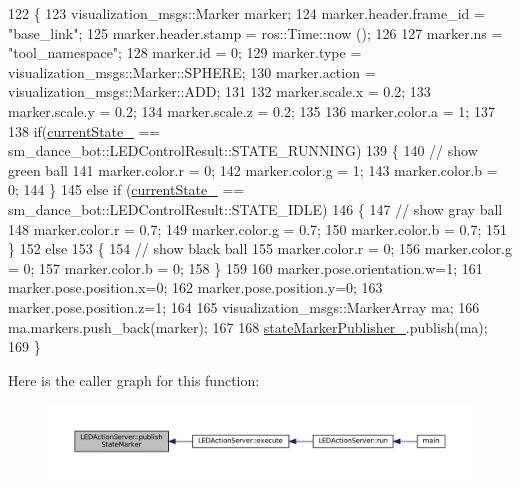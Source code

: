 \begin{DoxyCode}
122 \{
123     visualization\_msgs::Marker marker;
124     marker.header.frame\_id = \textcolor{stringliteral}{"base\_link"};
125     marker.header.stamp = ros::Time::now ();
126 
127     marker.ns = \textcolor{stringliteral}{"tool\_namespace"};
128     marker.id = 0;
129     marker.type = visualization\_msgs::Marker::SPHERE;
130     marker.action = visualization\_msgs::Marker::ADD;
131     
132     marker.scale.x = 0.2;
133     marker.scale.y = 0.2;
134     marker.scale.z = 0.2;
135 
136     marker.color.a = 1;
137 
138     \textcolor{keywordflow}{if}(\hyperlink{classLEDActionServer_a1dc456e987dc331501ad6ff2215661ff}{currentState\_} == sm\_dance\_bot::LEDControlResult::STATE\_RUNNING)
139     \{
140       \textcolor{comment}{// show green ball}
141       marker.color.r = 0;
142       marker.color.g = 1;
143       marker.color.b = 0;
144     \}
145     \textcolor{keywordflow}{else} \textcolor{keywordflow}{if} (\hyperlink{classLEDActionServer_a1dc456e987dc331501ad6ff2215661ff}{currentState\_} == sm\_dance\_bot::LEDControlResult::STATE\_IDLE)
146     \{
147       \textcolor{comment}{// show gray ball}
148       marker.color.r = 0.7;
149       marker.color.g = 0.7;
150       marker.color.b = 0.7;
151     \}
152     \textcolor{keywordflow}{else}
153     \{
154       \textcolor{comment}{// show black ball}
155       marker.color.r = 0;
156       marker.color.g = 0;
157       marker.color.b = 0;
158     \}
159 
160     marker.pose.orientation.w=1;
161     marker.pose.position.x=0;
162     marker.pose.position.y=0;
163     marker.pose.position.z=1;
164 
165     visualization\_msgs::MarkerArray ma;
166     ma.markers.push\_back(marker);
167 
168     \hyperlink{classLEDActionServer_a4168a1e4a17eb1d65aaa059ce0c52086}{stateMarkerPublisher\_}.publish(ma);
169 \}
\end{DoxyCode}
Here is the caller graph for this function\+:
\nopagebreak
\begin{figure}[H]
\begin{center}
\leavevmode
\includegraphics[width=350pt]{classLEDActionServer_a73bb754ac2347c50660624ad92315895_icgraph}
\end{center}
\end{figure}
\mbox{\label{classLEDActionServer_a73bb754ac2347c50660624ad92315895}} 
